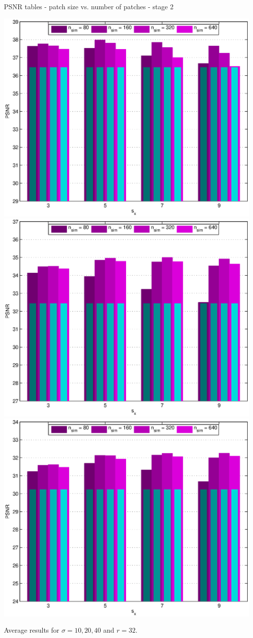 \documentclass[mathserif, 8pt]{beamer}
\begin{document}
\begin{frame}{PSNR tables - patch size vs. number of patches - stage 2}
	\begin{center}
		\includegraphics[width=.33\textwidth]{psnr_px2-np2-bars_2r32_s10_average.eps}%
		\includegraphics[width=.33\textwidth]{psnr_px2-np2-bars_2r32_s20_average.eps}%
		\includegraphics[width=.33\textwidth]{psnr_px2-np2-bars_2r32_s40_average.eps}
	\end{center}
	\begin{center}
	Average results for $\sigma = 10, 20, 40$ and $r = 32$.
	\end{center}
\end{frame}
\end{document}
